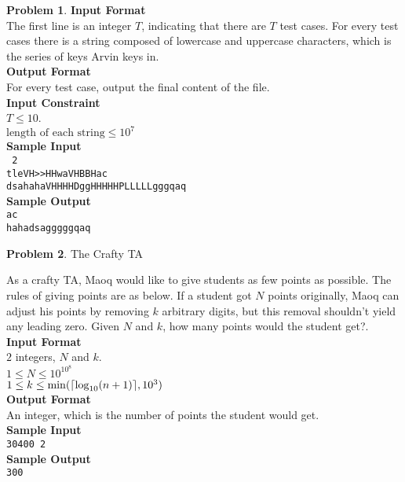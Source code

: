 \documentclass[12pt,a4paper]{report}
\theoremstyle{definition}
\newtheorem{problem}{\textbf{Problem}}
\theoremstyle{definition}
\DeclarePairedDelimiter\ceil{\lceil}{\rceil}
\begin{document}
\begin{problem}
\textbf{\large Input Format}\\
The first line is an integer $T$, indicating that there are $T$ test cases. For every test cases there is  a string composed of lowercase and uppercase characters, which is the series of keys Arvin keys in.\\

\textbf{\large Output Format}\\
For every test case, output the final content of the file.\\

\textbf{\large Input Constraint}\\
    $T \leq 10$.\\
    $\text{length of each string}\leq 10^7$\\

\textbf{\large Sample Input}\\
\texttt{ 2\\tleVH>>HHwaVHBBHac\\dsahahaVHHHHDggHHHHHPLLLLLgggqaq}\\

\textbf{\large Sample Output}\\
\texttt{ac\\hahadsagggggqaq }\\
\end{problem}
\newpage

\begin{problem}The Crafty TA

As a crafty TA, Maoq would like to give students as few points as possible. The rules of giving points are as below.
If a student got $N$ points originally, Maoq can adjust his points by removing $k$ arbitrary digits, but this removal shouldn't yield any leading zero. Given $N$ and $k$, how many points would the student get?.\\

\textbf{\large Input Format}\\
$2$ integers, $N$ and $k$.\\
$1\leq N\leq 10^{10^8}$\\
$1\leq k\leq\min(\ceil{\log_{10}(n+1)}, 10^3)$\\

\textbf{\large Output Format}\\
An integer, which is the number of points the student would get.\\

\textbf{\large Sample Input}\\
\texttt{30400 2}\\

\textbf{\large Sample Output}\\
\texttt{300}\\
\end{problem}
\end{document}
